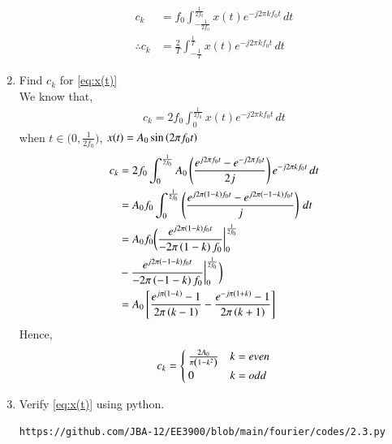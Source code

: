 \documentclass[journal,12pt,twocolumn]{IEEEtran}
\renewcommand\thesection{\arabic{section}}
\begin{document}
\begin{enumerate}[label=\thesection.\arabic*,ref=\thesection.\theenumi]
\begin{align}
    	\end{align}
    \begin{align}
  c_k &= f_0\int_{-\frac{1}{2f_0}}^{\frac{1}{2f_0}}x(t)e^{-j2\pi kf_0 t}\, dt\\
  \therefore c_k &= \frac{2}{T} \int_{-\frac{1}{T}}^{\frac{1}{T}}x(t)e^{-j2\pi kf_0 t}\, dt
    \end{align}
        \item Find $c_k$ for 
        \eqref{eq:x(t)}\\
        \solution
        We know that,
        \begin{align}
        c_k = 2f_0\int_{0}^{\frac{1}{2f_0}}x(t)e^{- j2 \pi kf_0 t}\, dt
        \end{align}
when $t \in \bigg( 0,\frac{1}{2f_0}\bigg)$, $x(t)=A_0 \sin\left(2 \pi f_0t\right)$\\
      \begin{align}
      c_k &= 2f_0\int_{0}^{\frac{1}{2f_0}}A_0 \left(\frac{e^{j2\pi f_0t}-e^{-j 2\pi f_0t}}{2j}\right) e^{- j2 \pi kf_0 t}\,dt\\
      &=A_0f_0\int_{0}^{\frac{1}{2f_0}} \left(\frac{e^{j2\pi\left(1-k\right) f_0t}-e^{j 2\pi\left(-1-k\right) f_0t}}{j}\right)\,dt\\
&=A_0f_0\bigg(\frac{e^{j2\pi\left(1-k\right) f_0t}}{-2\pi \left(1-k\right)f_0}\bigg|_0^{\frac{1}{2f_0}} \\&- \frac{e^{j2\pi\left(-1-k\right) f_0t}}{-2\pi \left(-1-k\right)f_0}\bigg|_0^{\frac{1}{2f_0}}\bigg)\\
&=A_0{}\left[\frac{e^{j\pi\left(1-k\right)}-1}{2\pi\left(k-1\right)}-\frac{e^{-j\pi\left(1+k\right)}-1}{2\pi\left(k+1\right)}\right]
      \end{align}
  Hence,
      \begin{equation}
      \label{eq:ck}
     c_k= \begin{cases}
\frac{2A_0}{\pi\left(1-k^2\right)}&k=even
\\
0&k=odd
\end{cases}
      \end{equation}
    \item Verify 
        \eqref{eq:x(t)}
        using python.\\
        \solution 
        \begin{lstlisting}
https://github.com/JBA-12/EE3900/blob/main/fourier/codes/2.3.py
        \end{lstlisting}
          \begin{figure}[!ht]
			\centering

\end{figure}
\end{enumerate}
\end{document}
